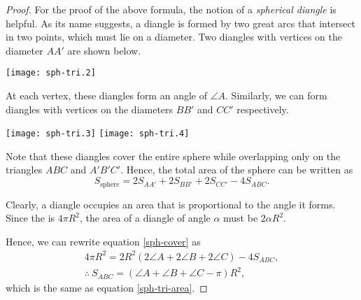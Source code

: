\documentclass[12pt]{article}
\begin{document}
\begin{proof}
For the proof of the above formula, the notion of a \emph{spherical diangle}
is helpful. As its name suggests, a diangle is formed by two great arcs
that intersect in two points, which must lie on a diameter. Two diangles
with vertices on the diameter $AA'$ are shown below.
\begin{center}
  \texttt{[image: sph-tri.2]}
\end{center}
At each vertex, these diangles form an angle of $\angle A$. Similarly,
we can form diangles with vertices on the diameters $BB'$ and $CC'$
respectively.
\begin{center}
  \texttt{[image: sph-tri.3]}
  \texttt{[image: sph-tri.4]}
\end{center}
Note that these diangles cover the entire sphere while overlapping
only on the triangles $ABC$ and $A'B'C'$. Hence, the total area of
the sphere can be written as
\begin{equation}\label{sph-cover}
  S_{\mathrm{sphere}} = 2S_{AA'} + 2S_{BB'} + 2S_{CC'} - 4S_{ABC}.
\end{equation}

Clearly, a diangle occupies an area that is proportional to the angle
it forms. Since the 
is $4\pi R^2$, the area of a diangle of angle $\alpha$ must be $2\alpha R^2$.

Hence, we can rewrite equation \eqref{sph-cover} as
\begin{gather*}
  4\pi R^2 = 2 R^2 (2\angle A + 2\angle B + 2\angle C) - 4S_{ABC}, \\
  \therefore ~ S_{ABC} = (\angle A + \angle B + \angle C - \pi) R^2,
\end{gather*}
which is the same as equation \eqref{sph-tri-area}.
\end{proof}
\end{document}
